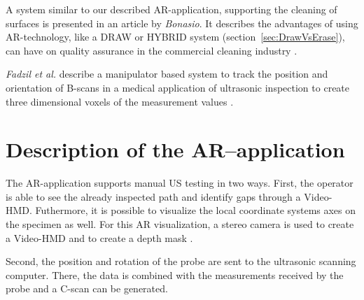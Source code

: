 \documentclass{VRARWorkshop}
\begin{document}
A system similar to our described AR-application, supporting the cleaning of surfaces is presented in an article by \textit{Bonasio}.
It describes the advantages of using AR-technology, like a DRAW or HYBRID system (section~\ref{sec:DrawVsErase}), can have on quality assurance in the commercial cleaning industry \cite{ARClean}.

\textit{Fadzil et al.} describe a manipulator based system to track the position and orientation of B-scans in a medical application of ultrasonic inspection to create three dimensional voxels of the measurement values \cite{fadzil_design_2015}.

\section{Description of the AR--application}
The AR-application supports manual US testing in two ways.
First, the operator is able to see the already inspected path and identify gaps through a {\sc Video-HMD}.
Futhermore, it is possible to visualize the local coordinate systems axes on the specimen as well.
For this AR visualization, a stereo camera is used to create a {\sc Video-HMD} and to create a depth mask \cite{dorner_virtual_2013}.

Second, the position and rotation of the probe are sent to the ultrasonic scanning computer.
There, the data is combined with the measurements received by the probe and a C-scan can be generated.
\end{document}
